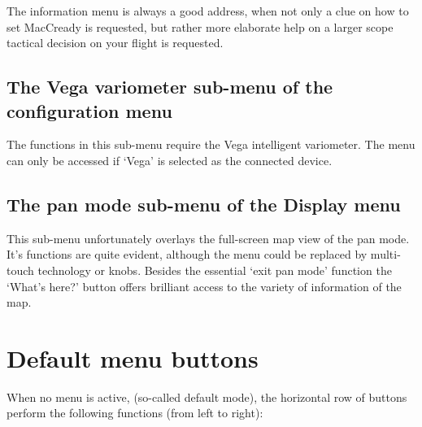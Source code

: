 The information menu is always a good address, when not only a clue on 
how to set MacCready is requested, but rather more elaborate help on a 
larger scope tactical decision on your flight is requested.


\subsection*{The Vega variometer sub-menu of the configuration menu}

\noindent{}

The functions in this sub-menu require the Vega intelligent variometer. 
The menu can only be accessed if `Vega' is selected as the connected device.

\subsection*{The pan mode sub-menu of the Display menu}

\noindent{}

This sub-menu unfortunately overlays the full-screen map view of the pan mode.
 It's functions are quite evident, although the menu could be replaced by multi-touch
 technology or knobs. Besides the essential `exit pan mode'
 function the `What's here?' button offers brilliant access to the variety of
 information of the map.

\section{Default menu buttons}

When no menu is active, (so-called default mode), the horizontal row
of buttons perform the following functions (from left to right):

